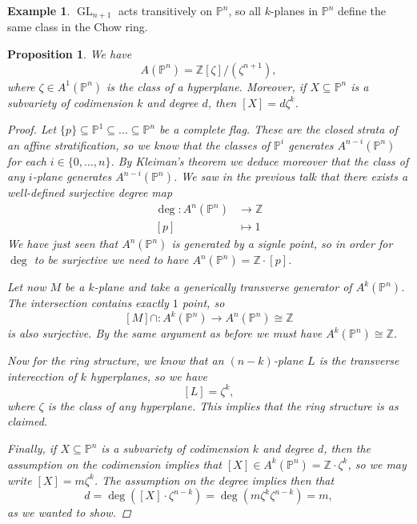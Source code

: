 \documentclass[12pt,a4paper]{amsart}
\theoremstyle{plain}
\newtheorem{prop}[thm]{Proposition}
\theoremstyle{definition}
\newtheorem{exmp}[thm]{Example}
\theoremstyle{remark}
\begin{document}
\begin{exmp}
    $\operatorname{GL}_{n+1}$ acts transitively on $\mathbb{P}^{n}$, so all $k$-planes in $\mathbb{P}^{n}$ define the same class in the Chow ring.
\end{exmp}

\begin{prop}
    We have
    \[ A(\mathbb{P}^{n})=\mathbb{Z}[\zeta]/(\zeta^{n+1}), \]
    where $\zeta\in A^{1}(\mathbb{P}^{n})$ is the class of a hyperplane.
    Moreover, if $X\subseteq \mathbb{P}^{n}$ is a subvariety of codimension $k$ and degree $d$, then $[X]=d\zeta^{k}$.
    \begin{proof}
	Let $\{p\}\subseteq \mathbb{P}^{1}\subseteq \ldots \subseteq \mathbb{P}^{n}$ be a complete flag.
	These are the closed strata of an affine stratification, so we know that the classes of $\mathbb{P}^{i}$ generates $A^{n-i}(\mathbb{P}^{n})$ for each $i\in \{0,\ldots,n\}$.
	By Kleiman's theorem we deduce moreover that the class of any $i$-plane generates $A^{n-i}(\mathbb{P}^{n})$.
	We saw in the previous talk that there exists a well-defined surjective degree map
	\begin{align*}
	    \deg\colon A^{n}(\mathbb{P}^{n}) &\longrightarrow \mathbb{Z} \\
	    [p] & \longmapsto 1
	\end{align*}
	We have just seen that $A^{n}(\mathbb{P}^{n})$ is generated by a signle point, so in order for $\deg$ to be surjective we need to have $A^{n}(\mathbb{P}^{n})=\mathbb{Z}\cdot [p]$.

	Let now $M$ be a $k$-plane and take a generically transverse generator of $A^{k}(\mathbb{P}^{n})$.
	The intersection contains exactly $1$ point, so
	\[ [M]\cap \colon A^{k}(\mathbb{P}^{n})\to A^{n}(\mathbb{P}^{n})\cong \mathbb{Z} \]
	is also surjective.
	By the same argument as before we must have $A^{k}(\mathbb{P}^{n})\cong \mathbb{Z}$.

	Now for the ring structure, we know that an $(n-k)$-plane $L$ is the transverse interecction of $k$ hyperplanes, so we have
	\[ [L]=\zeta^{k}, \]
	where $\zeta$ is the class of any hyperplane.
	This implies that the ring structure is as claimed.

	Finally, if $X\subseteq \mathbb{P}^{n}$ is a subvariety of codimension $k$ and degree $d$, then the assumption on the codimension implies that $[X]\in A^{k}(\mathbb{P}^{n})=\mathbb{Z}\cdot \zeta^{k}$, so we may write $[X]=m\zeta^{k}$.
	The assumption on the degree implies then that
	\[ d=\deg([X]\cdot \zeta^{n-k})=\deg(m\zeta^{k}\zeta^{n-k})=m, \]
	as we wanted to show.
    \end{proof}
\end{prop}
\end{document}
